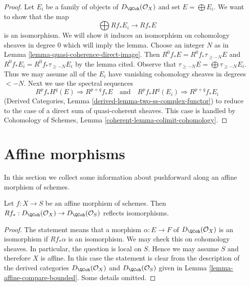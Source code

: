 \begin{proof}
Let $E_i$ be a family of objects of $D_\QCoh(\mathcal{O}_X)$
and set $E = \bigoplus E_i$. We want to show that the map
$$
\bigoplus Rf_*E_i \longrightarrow Rf_*E
$$
is an isomorphism. We will show it induces an isomorphism on
cohomology sheaves in degree $0$ which will imply the lemma.
Choose an integer $N$ as in Lemma \ref{lemma-quasi-coherence-direct-image}.
Then $R^0f_*E = R^0f_*\tau_{\geq -N}E$ and
$R^0f_*E_i = R^0f_*\tau_{\geq -N}E_i$ by the lemma cited. Observe that
$\tau_{\geq -N}E = \bigoplus \tau_{\geq -N}E_i$.
Thus we may assume all of the $E_i$ have vanishing cohomology
sheaves in degrees $< -N$. Next we use the spectral sequences
$$
R^pf_*H^q(E) \Rightarrow R^{p + q}f_*E
\quad\text{and}\quad
R^pf_*H^q(E_i) \Rightarrow R^{p + q}f_*E_i
$$
(Derived Categories, Lemma \ref{derived-lemma-two-ss-complex-functor})
to reduce to the case of a direct sum of quasi-coherent sheaves.
This case is handled by
Cohomology of Schemes, Lemma \ref{coherent-lemma-colimit-cohomology}.
\end{proof}









\section{Affine morphisms}
\label{section-affine-morphisms}

\noindent
In this section we collect some information about pushforward
along an affine morphism of schemes.

\begin{lemma}
\label{lemma-affine-morphism}
Let $f : X \to S$ be an affine morphism of schemes.
Then
$Rf_* : D_\QCoh(\mathcal{O}_X) \to D_\QCoh(\mathcal{O}_S)$
reflects isomorphisms.
\end{lemma}

\begin{proof}
The statement means that a morphism $\alpha : E \to F$ of
$D_\QCoh(\mathcal{O}_X)$ is an isomorphism if
$Rf_*\alpha$ is an isomorphism. We may check this on cohomology sheaves.
In particular, the question is local on $S$. Hence we may assume $S$
and therefore $X$ is affine. In this case the statement is clear from
the description of the derived categories
$D_\QCoh(\mathcal{O}_X)$ and
$D_\QCoh(\mathcal{O}_S)$ given in
Lemma \ref{lemma-affine-compare-bounded}.
Some details omitted.
\end{proof}


